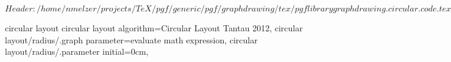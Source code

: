 %
%
%

\ProvidesFileRCS[v\pgfversion] $Header: /home/nmelzer/projects/TeX/pgf/generic/pgf/graphdrawing/tex/pgflibrarygraphdrawing.circular.code.tex,v 1.1 2012/04/16 13:23:56 tantau Exp $



%
%
\pgfgddeclarealgorithmkey
  {circular layout}
  {circular layout}
  {
    algorithm=Circular Layout Tantau 2012,
    circular layout/radius/.graph parameter=evaluate math expression,
    circular layout/radius/.parameter initial=0cm,
  }



\endinput